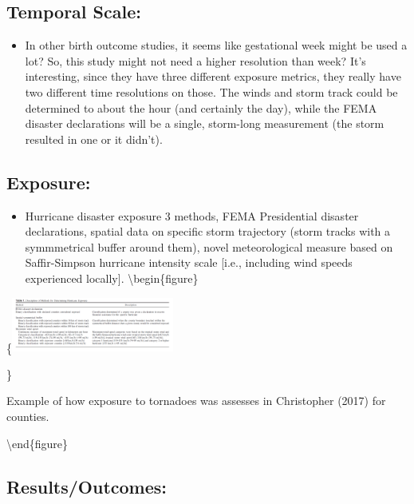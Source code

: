 \documentclass[
]{article}
\providecommand{\tightlist}{%
  \setlength{\itemsep}{0pt}\setlength{\parskip}{0pt}}
\begin{document}
\hypertarget{temporal-scale-7}{%
\subsection{Temporal Scale:}\label{temporal-scale-7}}

\begin{itemize}
\tightlist
\item
  In other birth outcome studies, it seems like gestational week might
  be used a lot? So, this study might not need a higher resolution than
  week? It's interesting, since they have three different exposure
  metrics, they really have two different time resolutions on those. The
  winds and storm track could be determined to about the hour (and
  certainly the day), while the FEMA disaster declarations will be a
  single, storm-long measurement (the storm resulted in one or it
  didn't).
\end{itemize}

\hypertarget{exposure-6}{%
\subsection{Exposure:}\label{exposure-6}}

\begin{itemize}
\tightlist
\item
  Hurricane disaster exposure 3 methods, FEMA Presidential disaster
  declarations, spatial data on specific storm trajectory (storm tracks
  with a symmmetrical buffer around them), novel meteorological measure
  based on Saffir-Simpson hurricane intensity scale {[}i.e., including
  wind speeds experienced locally{]}. \textbackslash{}begin\{figure\}
\end{itemize}

\{\centering \includegraphics[width=0.4\textwidth]{figures/grabich_hurricane_exposure_methods}

\}

\caption{Example of how exposure to tornadoes was assesses in Christopher (2017) for counties.}\label{fig:unnamed-chunk-2}

\textbackslash{}end\{figure\}

\hypertarget{resultsoutcomes-6}{%
\subsection{Results/Outcomes:}\label{resultsoutcomes-6}}
\end{document}
